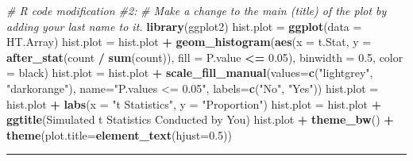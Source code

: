 \documentclass[oneside,openany]{book}
\newenvironment{Shaded}{\begin{snugshade}}{\end{snugshade}}
\newcommand{\AttributeTok}[1]{\textcolor[rgb]{0.13,0.29,0.53}{#1}}
\newcommand{\CommentTok}[1]{\textcolor[rgb]{0.56,0.35,0.01}{\textit{#1}}}
\newcommand{\FloatTok}[1]{\textcolor[rgb]{0.00,0.00,0.81}{#1}}
\newcommand{\FunctionTok}[1]{\textcolor[rgb]{0.13,0.29,0.53}{\textbf{#1}}}
\newcommand{\NormalTok}[1]{#1}
\newcommand{\OtherTok}[1]{\textcolor[rgb]{0.56,0.35,0.01}{#1}}
\newcommand{\SpecialCharTok}[1]{\textcolor[rgb]{0.81,0.36,0.00}{\textbf{#1}}}
\newcommand{\StringTok}[1]{\textcolor[rgb]{0.31,0.60,0.02}{#1}}
\begin{document}
\begin{enumerate}
\begin{Shaded}
\begin{Highlighting}[]
\CommentTok{\# R code modification \#2: }
\CommentTok{\# Make a change to the main (title) of the plot by adding your last name to it.}
\FunctionTok{library}\NormalTok{(ggplot2)}
\NormalTok{hist.plot }\OtherTok{=} \FunctionTok{ggplot}\NormalTok{(}\AttributeTok{data =}\NormalTok{ HT.Array) }
\NormalTok{hist.plot }\OtherTok{=}\NormalTok{ hist.plot }\SpecialCharTok{+} \FunctionTok{geom\_histogram}\NormalTok{(}\FunctionTok{aes}\NormalTok{(}\AttributeTok{x =}\NormalTok{ t.Stat,}
                                           \AttributeTok{y =} \FunctionTok{after\_stat}\NormalTok{(count }\SpecialCharTok{/} \FunctionTok{sum}\NormalTok{(count)),}
                                           \AttributeTok{fill =}\NormalTok{ P.value }\SpecialCharTok{\textless{}=} \FloatTok{0.05}\NormalTok{), }
                                       \AttributeTok{binwidth =} \FloatTok{0.5}\NormalTok{, }
                                       \AttributeTok{color =} \StringTok{\textquotesingle{}black\textquotesingle{}}\NormalTok{)}
\NormalTok{hist.plot }\OtherTok{=}\NormalTok{ hist.plot }\SpecialCharTok{+} \FunctionTok{scale\_fill\_manual}\NormalTok{(}\AttributeTok{values=}\FunctionTok{c}\NormalTok{(}\StringTok{"lightgrey"}\NormalTok{, }\StringTok{"darkorange"}\NormalTok{), }
                                          \AttributeTok{name=}\StringTok{"P.values \textless{}= 0.05"}\NormalTok{,}
                                          \AttributeTok{labels=}\FunctionTok{c}\NormalTok{(}\StringTok{"No"}\NormalTok{, }\StringTok{"Yes"}\NormalTok{))}
\NormalTok{hist.plot }\OtherTok{=}\NormalTok{ hist.plot }\SpecialCharTok{+} \FunctionTok{labs}\NormalTok{(}\AttributeTok{x =} \StringTok{"t Statistics"}\NormalTok{, }
                             \AttributeTok{y =} \StringTok{"Proportion"}\NormalTok{)}
\NormalTok{hist.plot }\OtherTok{=}\NormalTok{ hist.plot }\SpecialCharTok{+} \FunctionTok{ggtitle}\NormalTok{(}\StringTok{\textquotesingle{}Simulated t Statistics Conducted by You\textquotesingle{}}\NormalTok{)}
\NormalTok{hist.plot }\SpecialCharTok{+} \FunctionTok{theme\_bw}\NormalTok{() }\SpecialCharTok{+} \FunctionTok{theme}\NormalTok{(}\AttributeTok{plot.title=}\FunctionTok{element\_text}\NormalTok{(}\AttributeTok{hjust=}\FloatTok{0.5}\NormalTok{))}
\end{Highlighting}
\end{Shaded}
\end{enumerate}

\begin{center}\rule{0.5\linewidth}{0.5pt}\end{center}
\end{document}
